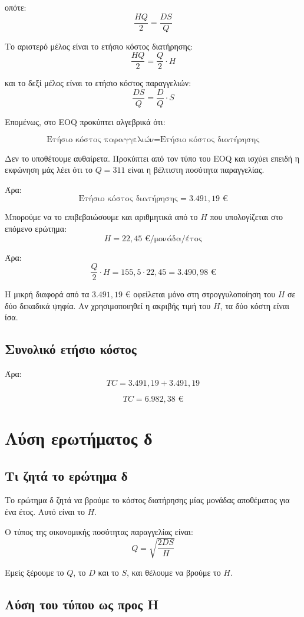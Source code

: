 \documentclass[12pt,a4paper]{article}
\begin{document}
οπότε:
\[
\frac{HQ}{2}=\frac{DS}{Q}
\]

Το αριστερό μέλος είναι το ετήσιο κόστος διατήρησης:
\[
\frac{HQ}{2}=\frac{Q}{2}\cdot H
\]

και το δεξί μέλος είναι το ετήσιο κόστος παραγγελιών:
\[
\frac{DS}{Q}=\frac{D}{Q}\cdot S
\]

Επομένως, στο EOQ προκύπτει αλγεβρικά ότι:

\[
\text{Ετήσιο κόστος παραγγελιών}
=
\text{Ετήσιο κόστος διατήρησης}
\]

Δεν το υποθέτουμε αυθαίρετα. Προκύπτει από τον τύπο του EOQ και ισχύει επειδή η εκφώνηση μάς λέει ότι το \(Q=311\) είναι η βέλτιστη ποσότητα παραγγελίας.

Άρα:
\[
\text{Ετήσιο κόστος διατήρησης}=3.491{,}19 \text{ €}
\]

Μπορούμε να το επιβεβαιώσουμε και αριθμητικά από το \(H\) που υπολογίζεται στο επόμενο ερώτημα:
\[
H=22{,}45 \text{ €/μονάδα/έτος}
\]

Άρα:
\[
\frac{Q}{2}\cdot H=155{,}5\cdot22{,}45=3.490{,}98 \text{ €}
\]

Η μικρή διαφορά από τα \(3.491{,}19\) € οφείλεται μόνο στη στρογγυλοποίηση του \(H\) σε δύο δεκαδικά ψηφία. Αν χρησιμοποιηθεί η ακριβής τιμή του \(H\), τα δύο κόστη είναι ίσα.

\subsection{Συνολικό ετήσιο κόστος}

Άρα:
\[
TC=3.491{,}19+3.491{,}19
\]

\[
\boxed{TC=6.982{,}38 \text{ €}}
\]

\section{Λύση ερωτήματος δ}

\subsection{Τι ζητά το ερώτημα δ}

Το ερώτημα δ ζητά να βρούμε το κόστος διατήρησης μίας μονάδας αποθέματος για ένα έτος. Αυτό είναι το \(H\).

Ο τύπος της οικονομικής ποσότητας παραγγελίας είναι:
\[
Q=\sqrt{\frac{2DS}{H}}
\]

Εμείς ξέρουμε το \(Q\), το \(D\) και το \(S\), και θέλουμε να βρούμε το \(H\).

\subsection{Λύση του τύπου ως προς H}
\end{document}
